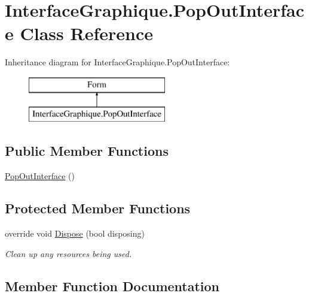 \hypertarget{class_interface_graphique_1_1_pop_out_interface}{}\section{Interface\+Graphique.\+Pop\+Out\+Interface Class Reference}
\label{class_interface_graphique_1_1_pop_out_interface}
Inheritance diagram for Interface\+Graphique.\+Pop\+Out\+Interface\+:\begin{figure}[H]
\begin{center}
\leavevmode
\includegraphics[height=2.000000cm]{class_interface_graphique_1_1_pop_out_interface}
\end{center}
\end{figure}
\subsection*{Public Member Functions}
\begin{DoxyCompactItemize}
\item 
\hyperlink{group__inf2990_gaef377ac8e5964cc5d2dfcdde8a130c99}{Pop\+Out\+Interface} ()
\end{DoxyCompactItemize}
\subsection*{Protected Member Functions}
\begin{DoxyCompactItemize}
\item 
override void \hyperlink{class_interface_graphique_1_1_pop_out_interface_a78c74282aa06c22d461e1d779e8fec89}{Dispose} (bool disposing)
\begin{DoxyCompactList}\small\item\em Clean up any resources being used. \end{DoxyCompactList}\end{DoxyCompactItemize}


\subsection{Member Function Documentation}
